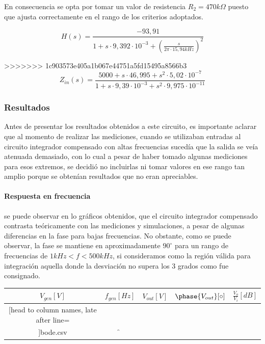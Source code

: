 En consecuencia se opta por tomar un valor de resistencia $R_2 = 470k\Omega$ puesto que ajusta correctamente en el rango de los criterios adoptados.

\begin{equation}
	H(s) = \frac{-93,91}{1 + s \cdot 9,392 \cdot 10^{-3} + \left( \frac{s}{2 \pi \cdot 15,94kHz} \right)^{2}}
\end{equation}

>>>>>>> 1c903573e405a1b067e44751a5fd15495a8566b3
\begin{equation}
	Z_{in}(s) = \frac{5000 + s \cdot 46,995 + s^{2} \cdot 5,02 \cdot 10^{-7}}{1 + s \cdot 9,39 \cdot 10^{-3} + s^{2} \cdot 9,975 \cdot 10^{-11}}
\end{equation}

	\subsubsection{Resultados}
Antes de presentar los resultados obtenidos a este circuito, es importante aclarar que al momento de realizar las mediciones, cuando se utilizaban entradas
al circuito integrador compensado con altas frecuencias suced\'ia que la salida se ve\'ia atenuada demasiado, con lo cual a pesar de haber tomado algunas mediciones 
para esos extremos, se decidi\'o no incluirlas ni tomar valores en ese rango tan amplio porque se obten\'ian resultados que no eran apreciables.

\paragraph*{Respuesta en frecuencia} se puede observar en lo gr\'aficos obtenidos, que el circuito integrador compensado
contrasta te\'oricamente con las mediciones y simulaciones, a pesar de algunas diferencias en la fase para bajas frecuencias. No obstante,
como se puede observar, la fase se mantiene en aproximadamente $90^{\circ}$ para un rango de frecuencias de $ 1kHz < f < 500kHz $, si consideramos como
la regi\'on v\'alida para integraci\'on aquella donde la desviaci\'on no supera los 3 grados como fue consignado.

\begin{table}[H]
	\centering
	\begin{tabular}{c c c c c}%
		$V_{gen} [V]$ & $f_{gen} [Hz]$ & $V_{out} [V]$ & $\phase{V_{out}} [\circ]$ & $\frac{V_o}{V_i} [dB]$ \\ \hline
		\csvreader[head to column names, late after line=\\]{bode.csv}{}{\in & \f & \out & \p & \db}
		\hline
	\end{tabular}
\end{table}

